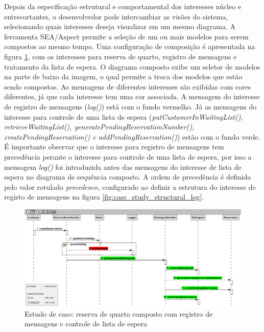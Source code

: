 Depois da especificação estrutural e comportamental dos interesses núcleo e entrecortantes, o desenvolvedor pode intercambiar as visões do sistema,
selecionando quais interesses deseja visualizar em um mesmo diagrama. A ferramenta SEA/Aspect permite a seleção de um ou mais modelos para serem
compostos ao mesmo tempo. Uma configuração de composição é apresentada na figura \ref{fig:case_study_compound_2}, com os interesses para reserva de
quarto, registro de mensagens e tratamento da lista de espera. O diagrama composto exibe um seletor de modelos na parte de baixo da imagem, o qual 
permite a troca dos modelos que estão sendo compostos. As mensagens de diferentes
interesses são exibidas com cores diferentes, já que cada interesse tem uma cor associada. A mensagem do interesse de registro de mensagens
(\textit{log()}) está com o fundo vermelho. Já as mensagens do interesse para controle de uma lista de espera (\textit{putCustomerInWaitingList(),
retrieveWaitingList(), generatePendingReservationNumber(), createPendingReservation() e addPendingReservation()}) estão com o fundo verde. É
importante observar que o interesse para registro de mensagens tem precedência perante o interesse para controle de uma lista de espera, por isso a
mensagem \textit{log()} foi introduzida antes das mensagens do interesse de lista de espera no diagrama de sequência composto. A ordem de
precedência é definida pelo valor rotulado \textit{precedence}, configurado ao definir a estrutura do interesse de registo de mensagens na figura
\ref{fig:case_study_structural_log}.

\begin{landscape}
  \begin{figure}[tb]
	\centering
	\includegraphics[scale=0.7]{img/case_study_compound_2.png}
	\caption{Estudo de caso: reserva de quarto composto com registro de mensagens e controle de lista de espera}\label{fig:case_study_compound_2}
  \end{figure}
\end{landscape}
  
